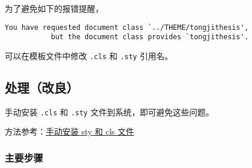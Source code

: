 \documentclass[../Main/thesis.tex]{subfiles}
\begin{document}
为了避免如下的报错提醒，

\begin{verbatim}
You have requested document class `../THEME/tongjithesis',
           but the document class provides `tongjithesis'.
\end{verbatim}

可以在模板文件中修改 \texttt{.cls} 和 \texttt{.sty} 引用名。

\begin{Shaded}
\begin{Highlighting}[]
\end{Highlighting}
\end{Shaded}

\subsection{处理（改良）}

手动安装 \texttt{.cls} 和 \texttt{.sty} 文件到系统，即可避免这些问题。

方法参考：\href{https://zhuanlan.zhihu.com/p/113124407}{手动安装 sty 和
cls 文件}

\subsubsection{主要步骤}
\end{document}

